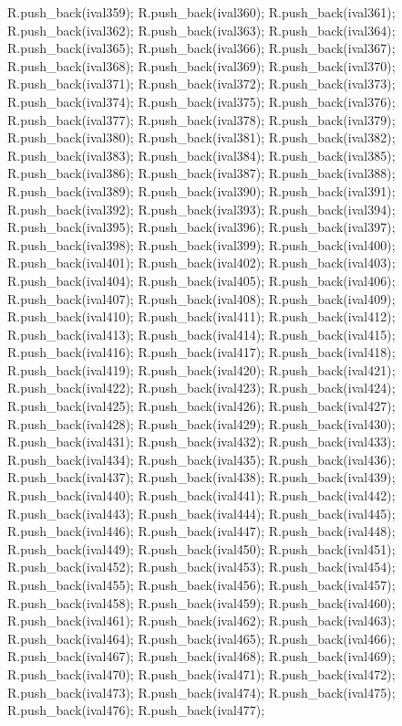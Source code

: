 \begin{DoxyCode}
{R.push_back(ival359);
R.push_back(ival360);
R.push_back(ival361);
R.push_back(ival362);
R.push_back(ival363);
R.push_back(ival364);
R.push_back(ival365);
R.push_back(ival366);
R.push_back(ival367);
R.push_back(ival368);
R.push_back(ival369);
R.push_back(ival370);
R.push_back(ival371);
R.push_back(ival372);
R.push_back(ival373);
R.push_back(ival374);
R.push_back(ival375);
R.push_back(ival376);
R.push_back(ival377);
R.push_back(ival378);
R.push_back(ival379);
R.push_back(ival380);
R.push_back(ival381);
R.push_back(ival382);
R.push_back(ival383);
R.push_back(ival384);
R.push_back(ival385);
R.push_back(ival386);
R.push_back(ival387);
R.push_back(ival388);
R.push_back(ival389);
R.push_back(ival390);
R.push_back(ival391);
R.push_back(ival392);
R.push_back(ival393);
R.push_back(ival394);
R.push_back(ival395);
R.push_back(ival396);
R.push_back(ival397);
R.push_back(ival398);
R.push_back(ival399);
R.push_back(ival400);
R.push_back(ival401);
R.push_back(ival402);
R.push_back(ival403);
R.push_back(ival404);
R.push_back(ival405);
R.push_back(ival406);
R.push_back(ival407);
R.push_back(ival408);
R.push_back(ival409);
R.push_back(ival410);
R.push_back(ival411);
R.push_back(ival412);
R.push_back(ival413);
R.push_back(ival414);
R.push_back(ival415);
R.push_back(ival416);
R.push_back(ival417);
R.push_back(ival418);
R.push_back(ival419);
R.push_back(ival420);
R.push_back(ival421);
R.push_back(ival422);
R.push_back(ival423);
R.push_back(ival424);
R.push_back(ival425);
R.push_back(ival426);
R.push_back(ival427);
R.push_back(ival428);
R.push_back(ival429);
R.push_back(ival430);
R.push_back(ival431);
R.push_back(ival432);
R.push_back(ival433);
R.push_back(ival434);
R.push_back(ival435);
R.push_back(ival436);
R.push_back(ival437);
R.push_back(ival438);
R.push_back(ival439);
R.push_back(ival440);
R.push_back(ival441);
R.push_back(ival442);
R.push_back(ival443);
R.push_back(ival444);
R.push_back(ival445);
R.push_back(ival446);
R.push_back(ival447);
R.push_back(ival448);
R.push_back(ival449);
R.push_back(ival450);
R.push_back(ival451);
R.push_back(ival452);
R.push_back(ival453);
R.push_back(ival454);
R.push_back(ival455);
R.push_back(ival456);
R.push_back(ival457);
R.push_back(ival458);
R.push_back(ival459);
R.push_back(ival460);
R.push_back(ival461);
R.push_back(ival462);
R.push_back(ival463);
R.push_back(ival464);
R.push_back(ival465);
R.push_back(ival466);
R.push_back(ival467);
R.push_back(ival468);
R.push_back(ival469);
R.push_back(ival470);
R.push_back(ival471);
R.push_back(ival472);
R.push_back(ival473);
R.push_back(ival474);
R.push_back(ival475);
R.push_back(ival476);
R.push_back(ival477);
}
\end{DoxyCode}
